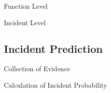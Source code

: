 \begin{frame}{Function Level}
    \begin{overlayarea}{\textwidth}{6cm}
    \begin{center}
      
    \end{center}
    \end{overlayarea}
\end{frame}

\begin{frame}{Incident Level}
\end{frame}

\subsection{Incident Prediction}
\begin{frame}{Collection of Evidence}
\end{frame}

\begin{frame}{Calculation of Incident Probability}
\end{frame} 